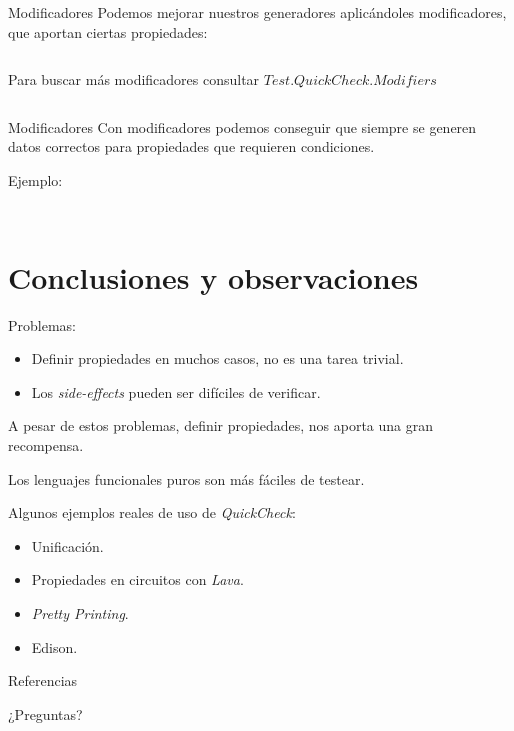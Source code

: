 \documentclass[10pt]{beamer}
\newcommand\Fontvi{\fontsize{10}{12}\selectfont}
\begin{document}
\begin{frame}{Modificadores}    %
  Podemos mejorar nuestros generadores aplicándoles modificadores, que
  aportan ciertas propiedades:

  \inputminted{haskell}{data/modificadores.hs}

  Para buscar más modificadores consultar $Test.QuickCheck.Modifiers$
\end{frame}

\begin{frame}[standout]
  \Fontvi
  \inputminted{text}{data/modificadores_prueba.txt}
\end{frame}

\begin{frame}{Modificadores}    %
  Con modificadores podemos conseguir que siempre se generen datos
  correctos para propiedades que requieren condiciones.

  Ejemplo:
  \inputminted{haskell}{data/modificadores2.hs}
\end{frame}

\begin{frame}[standout]
  \Fontvi
  \inputminted{text}{data/modificadores2_pruebas.txt}
\end{frame}

\section{Conclusiones y observaciones}

\begin{frame}
  Problemas:
  \begin{itemize}
  \item Definir propiedades en muchos casos, no es una tarea trivial.
  \item Los \textit{side-effects} pueden ser difíciles de verificar.
  \end{itemize}
  A pesar de estos problemas, definir propiedades, nos aporta una gran
  recompensa.

  Los lenguajes funcionales puros son más fáciles de testear.

  Algunos ejemplos reales de uso de \textit{QuickCheck}:
  \begin{itemize}
  \item Unificación.
  \item Propiedades en circuitos con \textit{Lava}.
  \item \textit{Pretty Printing}.
  \item Edison.
  \end{itemize}
\end{frame}

\appendix

\begin{frame}{Referencias}

  
  

\end{frame}

\begin{frame}[standout]
  ¿Preguntas?
\end{frame}
\end{document}
